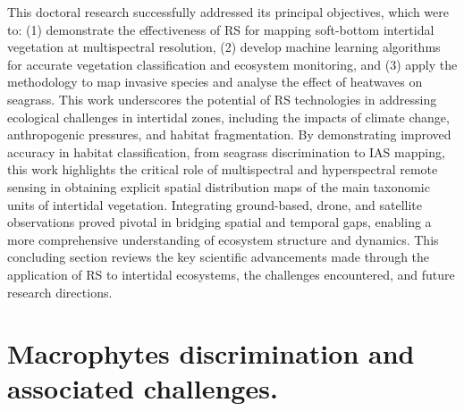 \documentclass[
  letterpaper,
  11pt,
  english,
  singlespacing,
  headsepline]{MastersDoctoralThesis}
\begin{document}
\begin{spacing}{1.5}

This doctoral research successfully addressed its principal objectives,
which were to: (1) demonstrate the effectiveness of RS for mapping
soft-bottom intertidal vegetation at multispectral resolution, (2)
develop machine learning algorithms for accurate vegetation
classification and ecosystem monitoring, and (3) apply the methodology
to map invasive species and analyse the effect of heatwaves on seagrass.
This work underscores the potential of RS technologies in addressing
ecological challenges in intertidal zones, including the impacts of
climate change, anthropogenic pressures, and habitat fragmentation. By
demonstrating improved accuracy in habitat classification, from seagrass
discrimination to IAS mapping, this work highlights the critical role of
multispectral and hyperspectral remote sensing in obtaining explicit
spatial distribution maps of the main taxonomic units of intertidal
vegetation. Integrating ground-based, drone, and satellite observations
proved pivotal in bridging spatial and temporal gaps, enabling a more
comprehensive understanding of ecosystem structure and dynamics. This
concluding section reviews the key scientific advancements made through
the application of RS to intertidal ecosystems, the challenges
encountered, and future research directions.

\section{Macrophytes discrimination and associated
challenges.}\label{macrophytes-discrimination-and-associated-challenges.}


\end{spacing}
\end{document}
